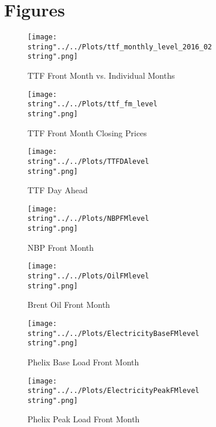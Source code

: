 \section{Figures}

\begin{figure}[ht]
  \centering
\texttt{[image: \\string"../../Plots/ttf\_monthly\_level\_2016\_02\\string".png]}
  \caption{TTF Front Month vs. Individual Months}\label{fig:ttf_monthly_level_2016_02}
\end{figure}



\begin{figure}[ht]
  \centering
\texttt{[image: \\string"../../Plots/ttf\_fm\_level\\string".png]}
  \caption{TTF Front Month Closing Prices}\label{fig:ttf_fm_level}
\end{figure}

\begin{figure}[ht]
  \centering
\texttt{[image: \\string"../../Plots/TTFDAlevel\\string".png]}
  \caption{TTF Day Ahead}\label{fig:TTFDAlevel}
\end{figure}

\begin{figure}[ht]
  \centering
\texttt{[image: \\string"../../Plots/NBPFMlevel\\string".png]}
  \caption{NBP Front Month}\label{fig:NBPFMlevel}
\end{figure}

\begin{figure}[ht]
  \centering
\texttt{[image: \\string"../../Plots/OilFMlevel\\string".png]}
  \caption{Brent Oil Front Month}\label{fig:OilFMlevel}
\end{figure}

\begin{figure}[ht]
  \centering
\texttt{[image: \\string"../../Plots/ElectricityBaseFMlevel\\string".png]}
  \caption{Phelix Base Load Front Month}\label{fig:ElectricityBaseFMlevel}
\end{figure}

\begin{figure}[ht]
  \centering
\texttt{[image: \\string"../../Plots/ElectricityPeakFMlevel\\string".png]}
  \caption{Phelix Peak Load Front Month}\label{fig:ElectricityPeakFMlevel}
\end{figure}

